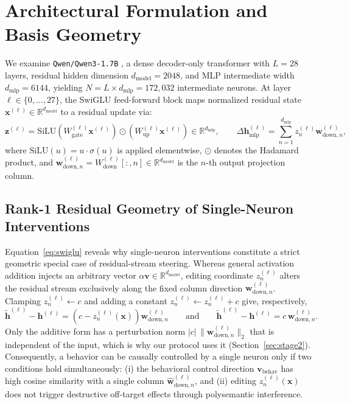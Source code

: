 \documentclass[11pt, a4paper]{article}
\begin{document}
\section{Architectural Formulation and Basis Geometry}

We examine \texttt{Qwen/\allowbreak{}Qwen3-1.7B} \cite{yang2025qwen3}, a dense decoder-only transformer with $L = 28$ layers, residual hidden dimension $d_{\mathrm{model}} = 2048$, and MLP intermediate width $d_{\mathrm{mlp}} = 6144$, yielding $N = L \times d_{\mathrm{mlp}} = 172{,}032$ intermediate neurons. At layer $\ell \in \{0, \dots, 27\}$, the SwiGLU feed-forward block \cite{shazeer2020glu} maps normalized residual state $\mathbf{x}^{(\ell)} \in \mathbb{R}^{d_{\mathrm{model}}}$ to a residual update via:
\begin{equation}\label{eq:swiglu}
    \mathbf{z}^{(\ell)} = \mathrm{SiLU}\!\left(W_{\mathrm{gate}}^{(\ell)} \mathbf{x}^{(\ell)}\right) \odot \left(W_{\mathrm{up}}^{(\ell)} \mathbf{x}^{(\ell)}\right) \in \mathbb{R}^{d_{\mathrm{mlp}}}, \qquad
    \Delta \mathbf{h}_{\mathrm{mlp}}^{(\ell)} = \sum_{n=1}^{d_{\mathrm{mlp}}} z_n^{(\ell)} \mathbf{w}_{\mathrm{down}, n}^{(\ell)},
\end{equation}
where $\mathrm{SiLU}(u) = u \cdot \sigma(u)$ is applied elementwise, $\odot$ denotes the Hadamard product, and $\mathbf{w}_{\mathrm{down}, n}^{(\ell)} = W_{\mathrm{down}}^{(\ell)}[:, n] \in \mathbb{R}^{d_{\mathrm{model}}}$ is the $n$-th output projection column.

\subsection{Rank-1 Residual Geometry of Single-Neuron Interventions}

Equation~\eqref{eq:swiglu} reveals why single-neuron interventions constitute a strict geometric special case of residual-stream steering. Whereas general activation addition injects an arbitrary vector $\alpha \mathbf{v} \in \mathbb{R}^{d_{\mathrm{model}}}$, editing coordinate $z_n^{(\ell)}$ alters the residual stream exclusively along the fixed column direction $\mathbf{w}_{\mathrm{down}, n}^{(\ell)}$. Clamping $z_n^{(\ell)} \leftarrow c$ and adding a constant $z_n^{(\ell)} \leftarrow z_n^{(\ell)} + c$ give, respectively,
\begin{equation}\label{eq:edit}
    \tilde{\mathbf{h}}^{(\ell)} - \mathbf{h}^{(\ell)} = \left(c - z_n^{(\ell)}(\mathbf{x})\right) \mathbf{w}_{\mathrm{down}, n}^{(\ell)}
    \qquad \text{and} \qquad
    \tilde{\mathbf{h}}^{(\ell)} - \mathbf{h}^{(\ell)} = c\, \mathbf{w}_{\mathrm{down}, n}^{(\ell)}.
\end{equation}
Only the additive form has a perturbation norm $|c|\,\|\mathbf{w}_{\mathrm{down}, n}^{(\ell)}\|_2$ that is independent of the input, which is why our protocol uses it (Section~\ref{sec:stage2}). Consequently, a behavior can be causally controlled by a single neuron only if two conditions hold simultaneously: (i) the behavioral control direction $\mathbf{v}_{\mathrm{behav}}$ has high cosine similarity with a single column $\hat{\mathbf{w}}_{\mathrm{down}, n}^{(\ell)}$, and (ii) editing $z_n^{(\ell)}(\mathbf{x})$ does not trigger destructive off-target effects through polysemantic interference.
\end{document}
